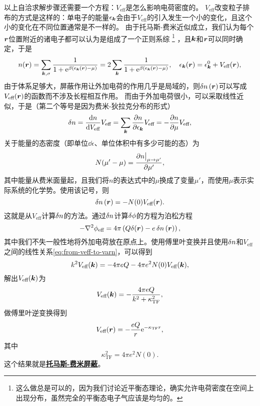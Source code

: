 \documentclass[hyperref, UTF8, a4paper]{ctexart}
\newcommand*{\ee}{\mathrm{e}}
\newcommand*{\concept}[1]{\underline{\textbf{#1}}}
\begin{document}
以上自洽求解步骤还需要一个方程：$V_\text{eff}$是怎么影响电荷密度的。
$V_\text{eff}$改变粒子排布的方式是这样的：单电子的能量$\epsilon_{\vb*{k}}$会由于$V_\text{eff}$的引入发生一个小的变化，且这个小的变化在不同位置通常是不一样的。
由于托马斯-费米近似成立，我们认为每个$\vb*{r}$位置附近的诸电子都可以认为是组成了一个正则系综%
\footnote{这么做总是可以的，因为我们讨论近平衡态理论，确实允许电荷密度在空间上出现分布，虽然完全的平衡态电子气应该是均匀的。}%
，且$\vb*{k}$和$\vb*{r}$可以同时确定，于是
\[
    n(\vb*{r}) = \sum_{\vb*{k}, \sigma} \frac{1}{1 + \ee^{\beta (\epsilon_{\vb*{k}}(\vb*{r}) - \mu)}} = 2 \sum_{\vb*{k}} \frac{1}{1 + \ee^{\beta (\epsilon_{\vb*{k}}(\vb*{r}) - \mu)}}, \quad \epsilon_{\vb*{k}}(\vb*{r}) = \epsilon_{\vb*{k}}^0 + V_\text{eff}(\vb*{r}),
\]
由于体系足够大，屏蔽作用让外加电荷的作用几乎是局域的，则$\var{n}(\vb*{r})$可以写成$V_\text{eff}(\vb*{r})$的函数而不涉及长程相互作用。
而由于外加电荷很小，可以采取线性近似，于是（第二个等号是因为费米-狄拉克分布的形式）
\[
    \var{n} = \dv{n}{V_\text{eff}} V_\text{eff} = \sum_{\vb*{k}} \pdv{n}{\epsilon_{\vb*{k}}} V_\text{eff} = - \pdv{n}{\mu} V_\text{eff},
\]
关于能量的态密度（即单位$\dd{\epsilon}$、单位体积中有多少可能的态）为
\begin{equation}
    N(\mu' - \mu) = \pdv{n\big|_{\mu \to \mu'}}{\mu'},
\end{equation}
其中能量从费米面量起，且我们将$n$的表达式中的$\mu$换成了变量$\mu'$，而使用$\mu$表示实际系统的化学势。使用该记号，则
\begin{equation}
    \var{n}(\vb*{r}) = - N(0) V_\text{eff}(\vb*{r}).
    \label{eq:from-veff-to-varn}
\end{equation}
这就是从$V_\text{eff}$计算$\var{n}$的方法。通过$\var{n}$计算$\var{\phi}$的方程为泊松方程
\[
    - \laplacian \phi_\text{eff} = 4 \pi \left( Q \delta(\vb*{r}) - e \var{n}(\vb*{r}) \right),
\]
其中我们不失一般性地将外加电荷放在原点上。使用傅里叶变换并且使用$\var{n}$和$V_\text{eff}$之间的线性关系\eqref{eq:from-veff-to-varn}，可以得到
\[
    k^2 V_\text{eff}(\vb*{k}) = - 4\pi e Q - 4 \pi e^2 N(0) V_\text{eff}(\vb*{k}),
\]
解出$V_\text{eff}(\vb*{k})$为
\[
    V_\text{eff}(\vb*{k}) = - \frac{4 \pi e Q}{k^2 + \kappa
    _\text{TF}^2},
\]
做傅里叶逆变换得到
\begin{equation}
    V_\text{eff}(\vb*{r}) = - \frac{eQ}{r} \ee^{- \kappa_\text{TF} r},
    \label{eq:thomas-fermi-potential}
\end{equation}
其中
\begin{equation}
    \kappa_\text{TF}^2 = 4 \pi e^2 N(0).
\end{equation}
这个结果就是\concept{托马斯-费米屏蔽}。
\end{document}
